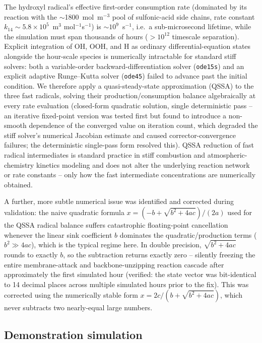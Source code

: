 \documentclass[10pt,twocolumn]{article}
\begin{document}
The hydroxyl radical's effective first-order consumption rate (dominated
by its reaction with the $\sim$1800~mol~m$^{-3}$ pool of sulfonic-acid
side chains, rate constant $k_{14}\sim5.8\times10^{5}$~m$^3$
mol$^{-1}$s$^{-1}$) is $\sim10^{9}$~s$^{-1}$, i.e.\ a sub-microsecond
lifetime, while the simulation must span thousands of hours
($>10^{12}$ timescale separation). Explicit integration of OH, OOH, and H
as ordinary differential-equation states alongside the hour-scale species
is numerically intractable for standard stiff solvers: both a
variable-order backward-differentiation solver (\texttt{ode15s}) and an
explicit adaptive Runge--Kutta solver (\texttt{ode45}) failed to advance
past the initial condition. We therefore apply a quasi-steady-state
approximation (QSSA) to the three fast radicals, solving their
production/consumption balance algebraically at every rate evaluation
(closed-form quadratic solution, single deterministic pass -- an
iterative fixed-point version was tested first but found to introduce a
non-smooth dependence of the converged value on iteration count, which
degraded the stiff solver's numerical Jacobian estimate and caused
corrector-convergence failures; the deterministic single-pass form
resolved this). QSSA reduction of fast radical intermediates is standard
practice in stiff combustion and atmospheric-chemistry kinetics modeling
\citep{turanyi2014} and does not alter the underlying reaction network or
rate constants -- only how the fast intermediate concentrations are
numerically obtained.

A further, more subtle numerical issue was identified and corrected
during validation: the naive quadratic formula
$x=(-b+\sqrt{b^2+4ac})/(2a)$ used for the QSSA radical balance suffers
catastrophic floating-point cancellation whenever the linear sink
coefficient $b$ dominates the quadratic/production terms
($b^2\gg4ac$), which is the typical regime here. In double precision,
$\sqrt{b^2+4ac}$ rounds to exactly $b$, so the subtraction returns
exactly zero -- silently freezing the entire membrane-attack and
backbone-unzipping reaction cascade after approximately the first
simulated hour (verified: the state vector was bit-identical to 14
decimal places across multiple simulated hours prior to the fix). This
was corrected using the numerically stable form
$x=2c/(b+\sqrt{b^2+4ac})$, which never subtracts two nearly-equal large
numbers.

\subsection{Demonstration simulation}
\end{document}

